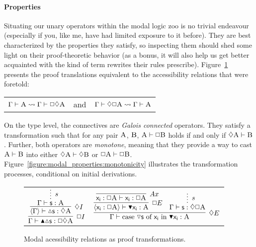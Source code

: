 \paragraph{Properties}
Situating our unary operators within the modal logic zoo is no trivial endeavour (especially if you, like me, have had limited exposure to it before).
They are best characterized by the properties they satisfy, so inspecting them should shed some light on their proof-theoretic behavior (as a bonus, it will also help us get better acquainted with the kind of term rewrites their rules prescribe).
Figure~\ref{figure:modal_properties:accessibility} presents the proof translations equivalent to the accessibility relations that were foretold:
\begin{center}
\begin{tabularx}{0.65\textwidth}{@{}ccc@{}}
	$ \Gamma \vdash \smallprop{A} \leadsto \Gamma \vdash \Box\diamond \smallprop{A}$ & and & $\Gamma \vdash \diamond\Box \smallprop{A} \leadsto \Gamma \vdash \smallprop{A}$
\end{tabularx}
\end{center}
On the type level, the connectives are \textit{Galois connected} operators.
They satisfy a transformation such that for any pair $\smallprop{A}$, $\smallprop{B}$, $\smallprop{A} \vdash \Box \smallprop{B}$ holds if and only if $\diamond \smallprop{A} \vdash \smallprop{B}$.
Further, both operators are \textit{monotone}, meaning that they provide a way to cast $\smallprop{A} \vdash \smallprop{B}$ into either $\diamond \smallprop{A} \vdash \diamond \smallprop{B}$ or $\Box \smallprop{A} \vdash \Box \smallprop{B}$.
Figure~\ref{figure:modal_properties:monotonicity} illustrates the transformation processes, conditional on initial derivations.


\begin{figure}
	\centering
	\begin{tabularx}{0.75\textwidth}{@{}c@{\qquad}c@{}}
		$
		\infer[\Box I]{\Gamma \vdash \boxintro\diaintro\term{s}:\Box \diamond \prop{A}}{
			\infer[\diamond I]{\bracket{\Gamma} \vdash \diaintro\term{s}: \diamond \prop{A}}{
				\infer*[s]{\Gamma \vdash \term{s}: \prop{A}}{}
			}
		}
		$
		&
		$
		\infer[\diamond E]{\Gamma \vdash \cterm{case \term{\diaelim{s}} of \term{x_i} in \term{\boxelim x_i}}: \prop{A}}{
			\infer[\Box E]{\bracket{\term{x_i}: \Box \prop{A}}\vdash \boxelim\term{x_i}:\prop{A}}{
				\infer[Ax]{\term{x_i}: \Box\prop{A} \vdash \term{x_i}: \Box\prop{A}}{}
			}
			&
			\infer*[s]{\Gamma\vdash \term{s}: \diamond \Box \prop{A}}{}
		}
		$
		\end{tabularx}
	\caption{Modal acessibility relations as proof transformations.}
	\label{figure:modal_properties:accessibility}
\end{figure}

